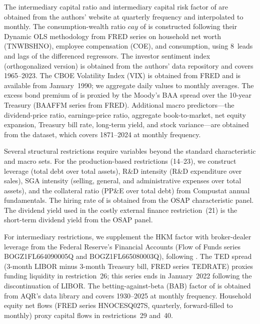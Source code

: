The intermediary capital ratio and intermediary capital risk factor of \citet{hekellymanela2017} are obtained from the authors' website at quarterly frequency and interpolated to monthly.
The consumption-wealth ratio $\mathit{cay}$ of \citet{lettauludvigson2001} is constructed following their Dynamic OLS methodology from FRED series on household net worth (TNWBSHNO), employee compensation (COE), and consumption, using 8~leads and lags of the differenced regressors.
The \citet{bakerwurgler2006} investor sentiment index (orthogonalized version) is obtained from the authors' data repository and covers 1965--2023.
The CBOE Volatility Index (VIX) is obtained from FRED and is available from January~1990; we aggregate daily values to monthly averages.
The excess bond premium of \citet{gilchristzakrajsek2012} is proxied by the Moody's BAA spread over the 10-year Treasury (BAAFFM series from FRED).
Additional macro predictors---the dividend-price ratio, earnings-price ratio, aggregate book-to-market, net equity expansion, Treasury bill rate, long-term yield, and stock variance---are obtained from the \citet{welchgoyal2008} dataset, which covers 1871--2024 at monthly frequency.

Several structural restrictions require variables beyond the standard characteristic and macro sets.
For the production-based restrictions (14--23), we construct leverage (total debt over total assets), R\&D intensity (R\&D expenditure over sales), SGA intensity (selling, general, and administrative expenses over total assets), and the collateral ratio (PP\&E over total debt) from Compustat annual fundamentals.
The hiring rate of \citet{belolinbazdresch2014} is obtained from the OSAP characteristic panel.
The dividend yield used in the costly external finance restriction~(21) is the short-term dividend yield from the OSAP panel.

For intermediary restrictions, we supplement the HKM factor with broker-dealer leverage from the Federal Reserve's Financial Accounts (Flow of Funds series BOGZ1FL664090005Q and BOGZ1FL665080003Q), following \citet{adrianetulamuir2014}.
The TED spread (3-month LIBOR minus 3-month Treasury bill, FRED series TEDRATE) proxies funding liquidity in restriction~26; this series ends in January~2022 following the discontinuation of LIBOR.
The betting-against-beta (BAB) factor of \citet{frazzinipedersen2014} is obtained from AQR's data library and covers 1930--2025 at monthly frequency.
Household equity net flows (FRED series HNOCESQ027S, quarterly, forward-filled to monthly) proxy capital flows in restrictions~29 and~40.

